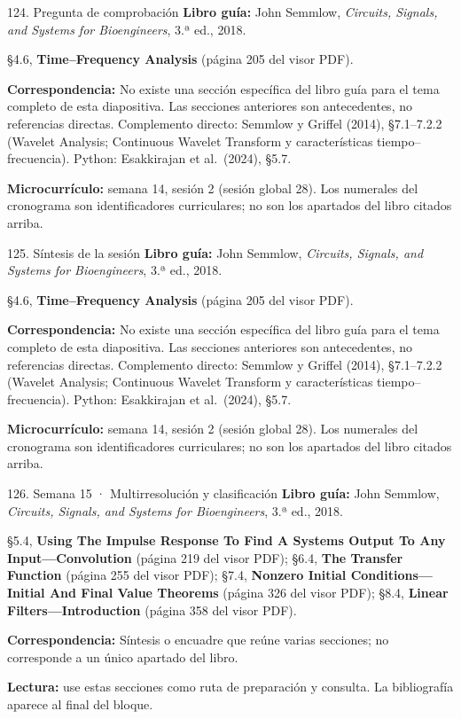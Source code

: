 \documentclass[
  10pt,
  ignorenonframetext,
  aspectratio=169,
  spanish,
]{beamer}
\begin{document}
\begin{frame}{124. Pregunta de comprobación}
\label{pregunta-de-comprobaciuxf3n-7}
\textbf{Libro guía:} John Semmlow, \emph{Circuits, Signals, and Systems
for Bioengineers}, 3.ª ed., 2018.

§4.6, \textbf{Time--Frequency Analysis} (página 205 del visor PDF).

\textbf{Correspondencia:} No existe una sección específica del libro
guía para el tema completo de esta diapositiva. Las secciones anteriores
son antecedentes, no referencias directas. Complemento directo: Semmlow
y Griffel (2014), §7.1--7.2.2 (Wavelet Analysis; Continuous Wavelet
Transform y características tiempo--frecuencia). Python: Esakkirajan et
al.~(2024), §5.7.

\textbf{Microcurrículo:} semana 14, sesión 2 (sesión global 28). Los
numerales del cronograma son identificadores curriculares; no son los
apartados del libro citados arriba.
\end{frame}

\begin{frame}{125. Síntesis de la sesión}
\label{suxedntesis-de-la-sesiuxf3n-7}
\textbf{Libro guía:} John Semmlow, \emph{Circuits, Signals, and Systems
for Bioengineers}, 3.ª ed., 2018.

§4.6, \textbf{Time--Frequency Analysis} (página 205 del visor PDF).

\textbf{Correspondencia:} No existe una sección específica del libro
guía para el tema completo de esta diapositiva. Las secciones anteriores
son antecedentes, no referencias directas. Complemento directo: Semmlow
y Griffel (2014), §7.1--7.2.2 (Wavelet Analysis; Continuous Wavelet
Transform y características tiempo--frecuencia). Python: Esakkirajan et
al.~(2024), §5.7.

\textbf{Microcurrículo:} semana 14, sesión 2 (sesión global 28). Los
numerales del cronograma son identificadores curriculares; no son los
apartados del libro citados arriba.
\end{frame}

\begin{frame}{126. Semana 15 · Multirresolución y clasificación}
\label{semana-15-multirresoluciuxf3n-y-clasificaciuxf3n}
\textbf{Libro guía:} John Semmlow, \emph{Circuits, Signals, and Systems
for Bioengineers}, 3.ª ed., 2018.

§5.4, \textbf{Using The Impulse Response To Find A Systems Output To Any
Input---Convolution} (página 219 del visor PDF); §6.4, \textbf{The
Transfer Function} (página 255 del visor PDF); §7.4, \textbf{Nonzero
Initial Conditions---Initial And Final Value Theorems} (página 326 del
visor PDF); §8.4, \textbf{Linear Filters---Introduction} (página 358 del
visor PDF).

\textbf{Correspondencia:} Síntesis o encuadre que reúne varias
secciones; no corresponde a un único apartado del libro.

\textbf{Lectura:} use estas secciones como ruta de preparación y
consulta. La bibliografía aparece al final del bloque.
\end{frame}
\end{document}
